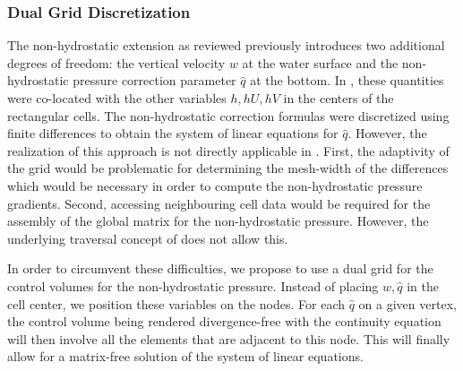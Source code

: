 \subsubsection*{Dual Grid Discretization}
The non-hydrostatic extension as reviewed previously introduces two additional degrees of freedom: the vertical velocity $w$ at the water surface and the non-hydrostatic pressure correction parameter $\hat q$ at the bottom. In \cite{samfass14extension}, these quantities were co-located with the other variables $h,hU,hV$ in the centers of the rectangular cells. The non-hydrostatic correction formulas were discretized using finite differences to obtain the system of linear equations for $\hat q$. However, the realization of this approach is not directly applicable in \samoa. First, the adaptivity of the grid would be problematic for determining the mesh-width of the differences which would be necessary in order to compute the non-hydrostatic pressure gradients. Second, accessing neighbouring cell data would be required for the assembly of the global matrix for the non-hydrostatic pressure. However, the underlying traversal concept of \samoa does not allow this. 

In order to circumvent these difficulties, we propose to use a dual grid for the control volumes for the non-hydrostatic pressure. Instead of placing $w, \hat q$ in the cell center, we position these variables on the nodes. For each $\hat q$ on a given vertex, the control volume being rendered divergence-free with the continuity equation will then involve all the elements that are adjacent to this node. This will finally allow for a matrix-free solution of the system of linear equations.


